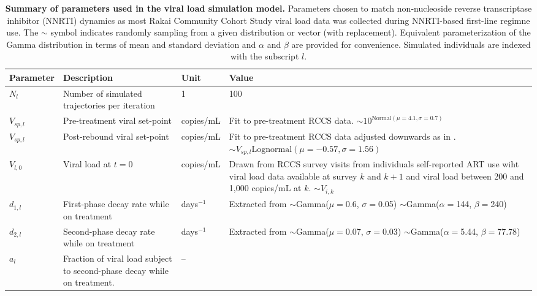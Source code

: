 \documentclass{article}[11pt]
\begin{document}
\begin{table}[hp]
\centering
\caption{\textbf{Summary of parameters used in the viral load simulation model.} Parameters chosen to match non-nucleoside reverse transcriptase inhibitor (NNRTI) dynamics as most Rakai Community Cohort Study viral load data was collected during NNRTI-based first-line regimne use. The $\sim$ symbol indicates randomly sampling from a given distribution or vector (with replacement). Equivalent parameterization of the Gamma distribution in terms of mean and standard deviation and $\alpha$ and $\beta$ are provided for convenience. Simulated individuals are indexed with the subscript $l$.}
\footnotesize
\begin{tabular}{lp{}p{}L{0.30\textwidth}}
\toprule
\textbf{Parameter} & \textbf{Description} & \textbf{Unit} & \textbf{Value} \\
\midrule
$N_l$ & Number of simulated trajectories per iteration & 1 & 100 \\
$V_{sp,l}$ & Pre-treatment viral set-point & copies/mL & Fit to pre-treatment RCCS data. \newline $\sim 10^{\text{Normal}(\mu=4.1, \sigma=0.7)}$ \\
$V_{sp,l}$ & Post-rebound viral set-point & copies/mL & Fit to pre-treatment RCCS data adjusted downwards as in . \newline $\sim V_{sp,l}\text{Lognormal}(\mu=-0.57, \sigma=1.56)$ \\
$V_{l,0}$ & Viral load at $t=0$ & copies/mL & Drawn from RCCS survey visits from individuals self-reported ART use wiht viral load data available at survey $k$ and $k+1$ and viral load between 200 and 1,000 copies/mL at $k$. \newline
$\sim V_{i,k}$ \\
$d_{1,l}$ & First-phase decay rate while on treatment & days$^{-1}$ & Extracted from 
\cite{andrade2013} \newline
$\sim$Gamma($\mu=$0.6, $\sigma=$0.05)  \newline
$\sim$Gamma($\alpha=$144, $\beta=$240) \\
$d_{2,l}$ & Second-phase decay rate while on treatment & days$^{-1}$ & Extracted from 
\cite{andrade2013} \newline
$\sim$Gamma($\mu=$0.07, $\sigma=$0.03) \newline
$\sim$Gamma($\alpha=$5.44, $\beta=$77.78) \\
$a_l$ & Fraction of viral load subject to second-phase decay while on treatment. & --

\end{tabular}
\end{table}
\end{document}
